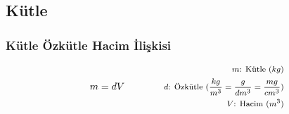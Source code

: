 \subsection{Kütle}

\subsubsection*{Kütle Özkütle Hacim İlişkisi}

\begin{equation}
    m = dV \qquad \qquad \parbox{4cm}{\footnotesize$
    \begin{aligned} 
        m\text{: Kütle } (kg) \\
        d\text{: Özkütle } (\frac{kg}{m^3} = \frac{g}{dm^3} = \frac{mg}{cm^3}) \\
        V\text{: Hacim } (m^3)
    \end{aligned}$}
\end{equation}
